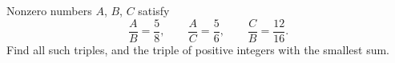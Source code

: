 Nonzero numbers $A$, $B$, $C$ satisfy
\[\dfrac AB=\dfrac58,\qquad\dfrac AC=\dfrac56,\qquad\dfrac CB=\dfrac{12}{16}.\]
Find all such triples, and the triple of positive integers with the smallest sum.
